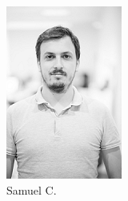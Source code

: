 \begin{figure}[h!]
\begin{subfigure}[b]{0.2\textwidth}
                \includegraphics[width=\textwidth]{images/samuel-serieux.png}
                \caption{Samuel C.}
            \end{subfigure}
            \begin{subfigure}[b]{0.2\textwidth}

\end{subfigure}
\end{figure}
